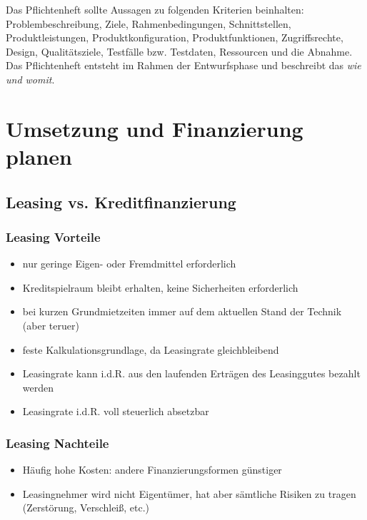 \documentclass[a4paper, 12pt]{report}
\begin{document}
Das Pflichtenheft sollte Aussagen zu folgenden Kriterien beinhalten:
Problembeschreibung, Ziele, Rahmenbedingungen, Schnittstellen,
Produktleistungen, Produktkonfiguration, Produktfunktionen, Zugriffsrechte,
Design, Qualitätsziele, Testfälle bzw. Testdaten, Ressourcen und die Abnahme. \\

Das Pflichtenheft entsteht im Rahmen der Entwurfsphase und beschreibt das
\emph{wie und womit}.

\section{Umsetzung und Finanzierung planen}
\subsection{Leasing vs. Kreditfinanzierung}

\subsubsection{Leasing Vorteile}

\begin{itemize}
    \item nur geringe Eigen- oder Fremdmittel erforderlich
    \item Kreditspielraum bleibt erhalten, keine Sicherheiten erforderlich
    \item bei kurzen Grundmietzeiten immer auf dem aktuellen Stand der Technik
	(aber teruer)
    \item feste Kalkulationsgrundlage, da Leasingrate gleichbleibend
    \item Leasingrate kann i.d.R. aus den laufenden Erträgen des Leasinggutes
	bezahlt werden
    \item Leasingrate i.d.R. voll steuerlich absetzbar
\end{itemize}

\subsubsection{Leasing Nachteile}
\begin{itemize}
    \item Häufig hohe Kosten: andere Finanzierungsformen günstiger
    \item Leasingnehmer wird nicht Eigentümer, hat aber sämtliche Risiken zu
    tragen (Zerstörung, Verschleiß, etc.)
\end{itemize}
\end{document}
